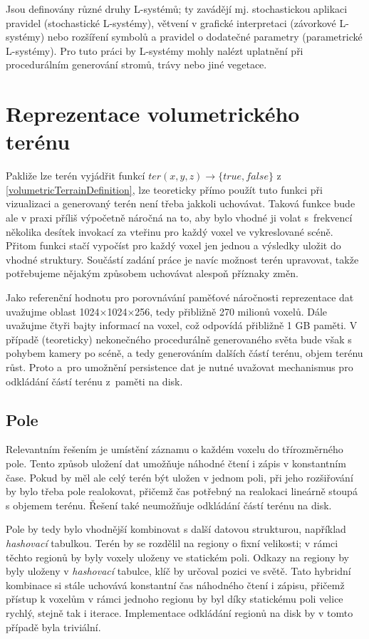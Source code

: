 Jsou definovány různé druhy L-systémů; ty zavádějí mj. stochastickou aplikaci pravidel (stochastické L-systémy), větvení v grafické interpretaci (závorkové L-systémy) nebo rozšíření symbolů a pravidel o dodatečné parametry (parametrické L-systémy).
Pro tuto práci by L-systémy mohly nalézt uplatnění při procedurálním generování stromů, trávy nebo jiné vegetace.


\section{Reprezentace volumetrického terénu}
Pakliže lze terén vyjádřit funkcí $ter(x, y, z) \rightarrow \{true, false\}$ z \ref{volumetricTerrainDefinition}, lze teoreticky přímo použít tuto funkci při vizualizaci a generovaný terén není třeba jakkoli uchovávat. Taková funkce bude ale v praxi příliš výpočetně náročná na to, aby bylo vhodné ji volat s~frekvencí několika desítek invokací za vteřinu pro každý voxel ve vykreslované scéně. Přitom funkci stačí vypočíst pro každý voxel jen jednou a výsledky uložit do vhodné struktury. Součástí zadání práce je navíc možnost terén upravovat, takže potřebujeme nějakým způsobem uchovávat alespoň příznaky změn.

Jako referenční hodnotu pro porovnávání paměťové náročnosti reprezentace dat uvažujme oblast 1024×1024×256, tedy přibližně 270 milionů voxelů. Dále uvažujme čtyři bajty informací na voxel, což odpovídá přibližně 1 GB paměti. V případě (teoreticky) nekonečného procedurálně generovaného světa bude však s pohybem kamery po scéně, a tedy generováním dalších částí terénu, objem terénu růst. Proto a~pro umožnění persistence dat je nutné uvažovat mechanismus pro odkládání částí terénu z~paměti na disk.

\subsection{Pole}
Relevantním řešením je umístění záznamu o každém voxelu do třírozměrného pole. Tento způsob uložení dat umožňuje náhodné čtení i zápis v konstantním čase. Pokud by měl ale celý terén být uložen v jednom poli, při jeho rozšiřování by bylo třeba pole realokovat, přičemž čas potřebný na realokaci lineárně stoupá s objemem terénu. Řešení také neumožňuje odkládání částí terénu na disk.

Pole by tedy bylo vhodnější kombinovat s další datovou strukturou, například \textit{hashovací} tabulkou. Terén by se rozdělil na regiony o fixní velikosti; v rámci těchto regionů by byly voxely uloženy ve statickém poli. Odkazy na regiony by byly uloženy v \textit{hashovací} tabulce, klíč by určoval pozici ve světě.
Tato hybridní kombinace si stále uchovává konstantní čas náhodného čtení i zápisu, přičemž přístup k voxelům v rámci jednoho regionu by byl díky statickému poli velice rychlý, stejně tak i iterace. Implementace odkládání regionů na disk by v tomto případě byla triviální.

